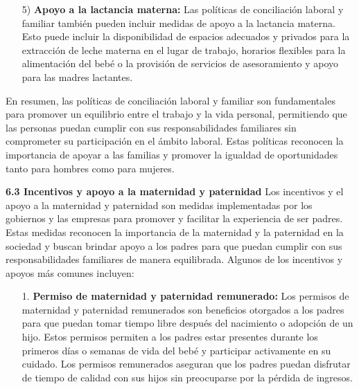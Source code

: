 \documentclass[8pt,a4paper]{beamer}
\begin{document}
{\begin{frame}{}
\begin{block}{}
\setlength{\parskip}{3px}
\justifying
\begin{enumerate}
\setlength{\parskip}{3px}
\justifying
\item[5)] \textbf{Apoyo a la lactancia materna:} Las políticas de conciliación laboral y familiar también pueden incluir medidas de apoyo a la lactancia materna. Esto puede incluir la disponibilidad de espacios adecuados y privados para la extracción de leche materna en el lugar de trabajo, horarios flexibles para la alimentación del bebé o la provisión de servicios de asesoramiento y apoyo para las madres lactantes.
\end{enumerate}
En resumen, las políticas de conciliación laboral y familiar son fundamentales para promover un equilibrio entre el trabajo y la vida personal, permitiendo que las personas puedan cumplir con sus responsabilidades familiares sin comprometer su participación en el ámbito laboral. Estas políticas reconocen la importancia de apoyar a las familias y promover la igualdad de oportunidades tanto para hombres como para mujeres.

\end{block}
\end{frame}


\begin{frame}{}
\begin{block}{\textbf{6.3 Incentivos y apoyo a la maternidad y paternidad}}
\setlength{\parskip}{3px}
\justifying
Los incentivos y el apoyo a la maternidad y paternidad son medidas implementadas por los gobiernos y las empresas para promover y facilitar la experiencia de ser padres. Estas medidas reconocen la importancia de la maternidad y la paternidad en la sociedad y buscan brindar apoyo a los padres para que puedan cumplir con sus responsabilidades familiares de manera equilibrada. Algunos de los incentivos y apoyos más comunes incluyen:
\begin{enumerate}
\setlength{\parskip}{3px}
\justifying
\item[1.] \textbf{Permiso de maternidad y paternidad remunerado:} Los permisos de maternidad y paternidad remunerados son beneficios otorgados a los padres para que puedan tomar tiempo libre después del nacimiento o adopción de un hijo. Estos permisos permiten a los padres estar presentes durante los primeros días o semanas de vida del bebé y participar activamente en su cuidado. Los permisos remunerados aseguran que los padres puedan disfrutar de tiempo de calidad con sus hijos sin preocuparse por la pérdida de ingresos.


\end{enumerate}
\end{block}
\end{frame}}
\end{document}
